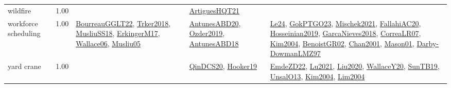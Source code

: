 {\begin{longtable}{p{3cm}r>{\raggedright\arraybackslash}p{6cm}>{\raggedright\arraybackslash}p{6cm}>{\raggedright\arraybackslash}p{8cm}}
\index{wildfire}\index{ApplicationAreas!wildfire}wildfire &  1.00 &  & \hyperref[detail:ArtiguesHQT21]{ArtiguesHQT21} & \\
\index{workforce scheduling}\index{ApplicationAreas!workforce scheduling}workforce scheduling &  1.00 & \hyperref[detail:BourreauGGLT22]{BourreauGGLT22}, \hyperref[detail:Trker2018]{Trker2018}, \hyperref[detail:MusliuSS18]{MusliuSS18}, \hyperref[detail:ErkingerM17]{ErkingerM17}, \hyperref[detail:Wallace06]{Wallace06}, \hyperref[detail:Musliu05]{Musliu05} & \hyperref[detail:AntunesABD20]{AntunesABD20}, \hyperref[detail:Ozder2019]{Ozder2019}, \hyperref[detail:AntunesABD18]{AntunesABD18} & \hyperref[detail:Le24]{Le24}, \hyperref[detail:GokPTGO23]{GokPTGO23}, \hyperref[detail:Mischek2021]{Mischek2021}, \hyperref[detail:FallahiAC20]{FallahiAC20}, \hyperref[detail:Hosseinian2019]{Hosseinian2019}, \hyperref[detail:GarcaNieves2018]{GarcaNieves2018}, \hyperref[detail:CorreaLR07]{CorreaLR07}, \hyperref[detail:Kim2004]{Kim2004}, \hyperref[detail:BenoistGR02]{BenoistGR02}, \hyperref[detail:Chan2001]{Chan2001}, \hyperref[detail:Mason01]{Mason01}, \hyperref[detail:Darby-DowmanLMZ97]{Darby-DowmanLMZ97}\\
\index{yard crane}\index{ApplicationAreas!yard crane}yard crane &  1.00 &  & \hyperref[detail:QinDCS20]{QinDCS20}, \hyperref[detail:Hooker19]{Hooker19} & \hyperref[detail:EmdeZD22]{EmdeZD22}, \hyperref[detail:Lu2021]{Lu2021}, \hyperref[detail:Liu2020]{Liu2020}, \hyperref[detail:WallaceY20]{WallaceY20}, \hyperref[detail:SunTB19]{SunTB19}, \hyperref[detail:UnsalO13]{UnsalO13}, \hyperref[detail:Kim2004]{Kim2004}, \hyperref[detail:Lim2004]{Lim2004}\\
\end{longtable}
}

\clearpage
